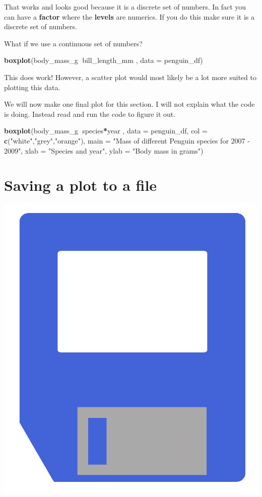 \documentclass[]{book}
\newenvironment{Shaded}{\begin{snugshade}}{\end{snugshade}}
\newcommand{\KeywordTok}[1]{\textcolor[rgb]{0.13,0.29,0.53}{\textbf{#1}}}
\newcommand{\DataTypeTok}[1]{\textcolor[rgb]{0.13,0.29,0.53}{#1}}
\newcommand{\StringTok}[1]{\textcolor[rgb]{0.31,0.60,0.02}{#1}}
\newcommand{\OperatorTok}[1]{\textcolor[rgb]{0.81,0.36,0.00}{\textbf{#1}}}
\newcommand{\NormalTok}[1]{#1}
\begin{document}
That works and looks good because it is a discrete set of numbers. In
fact you can have a \textbf{factor} where the \textbf{levels} are
numerics. If you do this make sure it is a discrete set of numbers.

What if we use a continuous set of numbers?

\begin{Shaded}
\begin{Highlighting}[]
\KeywordTok{boxplot}\NormalTok{(body_mass_g}\OperatorTok{~}\NormalTok{bill_length_mm , }\DataTypeTok{data =}\NormalTok{ penguin_df)}
\end{Highlighting}
\end{Shaded}

This does work! However, a scatter plot would most likely be a lot more
suited to plotting this data.

We will now make one final plot for this section. I will not explain
what the code is doing. Instead read and run the code to figure it out.

\begin{Shaded}
\begin{Highlighting}[]
\KeywordTok{boxplot}\NormalTok{(body_mass_g}\OperatorTok{~}\NormalTok{species}\OperatorTok{*}\NormalTok{year , }
        \DataTypeTok{data =}\NormalTok{ penguin_df, }
        \DataTypeTok{col =} \KeywordTok{c}\NormalTok{(}\StringTok{"white"}\NormalTok{,}\StringTok{"grey"}\NormalTok{,}\StringTok{"orange"}\NormalTok{),}
        \DataTypeTok{main =} \StringTok{"Mass of different Penguin species for 2007 - 2009"}\NormalTok{,}
        \DataTypeTok{xlab =} \StringTok{"Species and year"}\NormalTok{,}
        \DataTypeTok{ylab =} \StringTok{"Body mass in grams"}\NormalTok{)}
\end{Highlighting}
\end{Shaded}

\section{Saving a plot to a file}\label{saving-a-plot-to-a-file}

\begin{center}\includegraphics[width=0.2\linewidth]{figures/r_save} \end{center}
\end{document}
